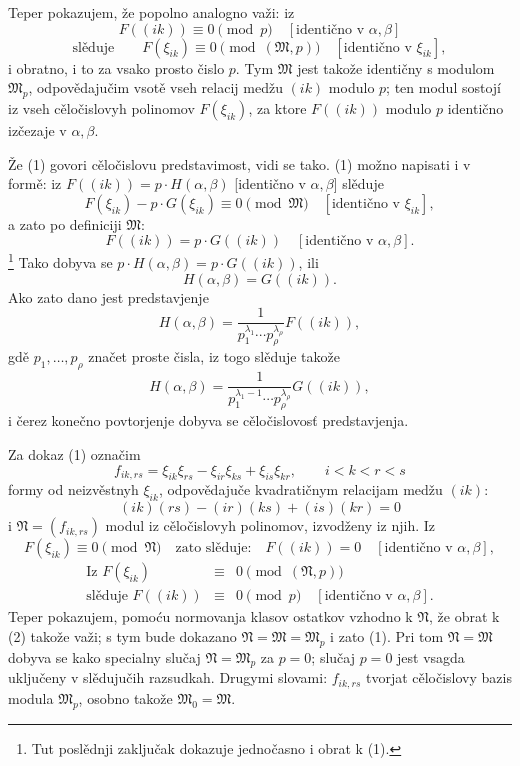 \documentclass[11pt]{article}
\providecommand{\frM}{\mathfrak M}
\providecommand{\frN}{\mathfrak N}
\begin{document}
Teper pokazujem, že popolno analogno važi: iz
\[
        F((ik))\equiv0\pmod p\quad [\text{identično v \(\alpha,\beta\)}]
\]
\begin{equation}
        \text{slěduje}\qquad
        F(\xi_{ik})\equiv0\pmod{(\frM,p)}\quad [\text{identično v \(\xi_{ik}\)}],
\end{equation}
i obratno, i to za vsako prosto čislo \(p\). Tym \(\frM\) jest takože identičny s modulom \(\frM_p\), odpovědajučim vsotě vseh relacij medžu \((ik)\) modulo \(p\); ten modul sostojí iz vseh cěločislovyh polinomov \(F(\xi_{ik})\), za ktore \(F((ik))\) modulo \(p\) identično izčezaje v \(\alpha,\beta\).

Že (1) govori cěločislovu predstavimost, vidi se tako. (1) možno napisati i v formě: iz \(F((ik))=p\cdot H(\alpha,\beta)\) [identično v \(\alpha,\beta\)] slěduje
\[
        F(\xi_{ik})-p\cdot G(\xi_{ik})\equiv0\pmod{\frM}
        \quad [\text{identično v \(\xi_{ik}\)}],
\]
a zato po definiciji \(\frM\):
\[
        F((ik))=p\cdot G((ik))\quad [\text{identično v \(\alpha,\beta\)}].
\]
\footnote{Tut poslědnji zaključak dokazuje jednočasno i obrat k (1).}
Tako dobyva se \(p\cdot H(\alpha,\beta)=p\cdot G((ik))\), ili
\[
        H(\alpha,\beta)=G((ik)).
\]
Ako zato dano jest predstavjenje
\[
        H(\alpha,\beta)
        =
        \frac1{p_1^{\lambda_1}\cdots p_\rho^{\lambda_\rho}}
        F((ik)),
\]
gdě \(p_1,\ldots,p_\rho\) značet proste čisla, iz togo slěduje takože
\[
        H(\alpha,\beta)
        =
        \frac1{p_1^{\lambda_1-1}\cdots p_\rho^{\lambda_\rho}}
        G((ik)),
\]
i čerez konečno povtorjenje dobyva se cěločislovosť predstavjenja.

Za dokaz (1) označim
\[
        f_{ik,rs}=\xi_{ik}\xi_{rs}-\xi_{ir}\xi_{ks}+\xi_{is}\xi_{kr},
        \qquad i<k<r<s
\]
formy od neizvěstnyh \(\xi_{ik}\), odpovědajuče kvadratičnym relacijam medžu \((ik)\):
\[
        (ik)(rs)-(ir)(ks)+(is)(kr)=0
\]
i \(\frN=(f_{ik,rs})\) modul iz cěločislovyh polinomov, izvodženy iz njih. Iz
\[
        F(\xi_{ik})\equiv0\pmod{\frN}
        \quad\text{zato slěduje:}\quad
        F((ik))=0\quad [\text{identično v \(\alpha,\beta\)}],
\]
\begin{equation}
\begin{array}{rcl}
        \text{Iz }F(\xi_{ik})&\equiv&0\pmod{(\frN,p)}\\
        \text{slěduje }F((ik))&\equiv&0\pmod p\quad[\text{identično v \(\alpha,\beta\)}].
\end{array}
\end{equation}
Teper pokazujem, pomoću normovanja klasov ostatkov vzhodno k \(\frN\), že obrat k (2) takože važi; s tym bude dokazano \(\frN=\frM=\frM_p\) i zato (1). Pri tom \(\frN=\frM\) dobyva se kako specialny slučaj \(\frN=\frM_p\) za \(p=0\); slučaj \(p=0\) jest vsagda uključeny v slědujučih razsudkah. Drugymi slovami: \(f_{ik,rs}\) tvorjat cěločislovy bazis modula \(\frM_p\), osobno takože \(\frM_0=\frM\).
\end{document}

